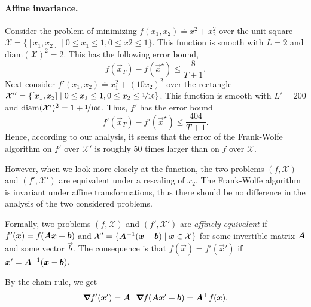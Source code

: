 \paragraph{Affine invariance.}

Consider the problem of minimizing $f(x_1, x_2) \doteq x_1^2 + x_2^2$ over the unit square
$\mathcal{X} = \{ [x_1,x_2] \mid 0 \leq x_1 \leq 1, 0 \leq x2 \leq 1 \}$. This function is smooth
with $L=2$ and $\mathrm{diam}(\mathcal{X})^2 = 2$. This has the following error bound, \[
    f(\vec{x}_T) - f(\vec{x}^\star) \leq \frac{8}{T+1}.
\]
Next consider $f'(x_1, x_2) \doteq x_1^2 + (10x_2)^2$ over the rectangle $\mathcal{X}'' = \{ [x_1,
            x_2] \mid 0 \leq x_1 \leq 1, 0\leq x_2 \leq \nicefrac{1}{10} \}$. This function is smooth with $L'
    = 200$ and $\mathrm{diam}(\mathcal{X}')^2 = 1 + \nicefrac{1}{100}$. Thus, $f'$ has the error bound \[
    f'(\vec{x}_T) - f'(\vec{x}^\star) \leq \frac{404}{T+1}.
\]
Hence, according to our analysis, it seems that the error of the Frank-Wolfe algorithm on $f'$ over
$\mathcal{X}'$ is roughly 50 times larger than on $f$ over $\mathcal{X}$.

However, when we look more closely at the function, the two problems $(f,\mathcal{X})$ and
$(f',\mathcal{X}')$ are equivalent under a rescaling of $x_2$. The Frank-Wolfe algorithm is
invariant under affine transformations, thus there should be no difference in the analysis of the
two considered problems.

Formally, two problems $(f, \mathcal{X})$ and $(f', \mathcal{X}')$ are \textit{affinely equivalent}
if $f'(\bm{x}) = f(\bm{A} \bm{x} + \bm{b})$ and $\mathcal{X}' = \{ \bm{A}^{-1}(\bm{x} -
    \bm{b}) \mid \bm{x} \in \mathcal{X} \}$ for some invertible matrix $\bm{A}$ and some vector
$\vec{b}$. The consequence is that $f(\vec{x}) = f'(\vec{x}')$ if $\bm{x}' = \bm{A}^{-1}
    (\bm{x} - \bm{b})$.

By the chain rule, we get \[
    \bm{\nabla}_{\! } f'(\bm{x}') = \bm{A}^\top \bm{\nabla}_{\! } f(\bm{A} \bm{x}' + \bm{b}) = \bm{A}^\top f(\bm{x}).
\]

